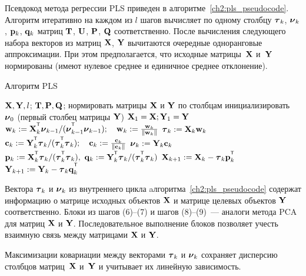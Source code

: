 \documentclass[11pt, a5paper]{dissert}
\begin{document}
Псевдокод метода регрессии PLS приведен в алгоритме~\ref{ch2:pls_pseudocode}.
Алгоритм итеративно на каждом из $l$ шагов вычисляет по одному столбцу $\boldsymbol{\tau}_k$, $\boldsymbol{\nu}_k$, $\mathbf{p}_k$, $\mathbf{q}_k$ матриц $\mathbf{T}$, $\mathbf{U}$, $\mathbf{P}$, $\mathbf{Q}$ соответственно. 
После вычисления следующего набора векторов из матриц $\mathbf{X}$, $\mathbf{Y}$ вычитаются очередные одноранговые аппроксимации. 
При этом предполагается, что исходные матрицы~$\mathbf{X}$ и~$\mathbf{Y}$ нормированы (имеют нулевое среднее и единичное среднее отклонение).

\begin{algorithm}[h]
	\caption{Алгоритм PLS}
	\label{ch2:pls_pseudocode}
	\begin{algorithmic}[1]
		\REQUIRE $\mathbf{X}, \mathbf{Y}, l$;
		\ENSURE $\mathbf{T}, \mathbf{P}, \mathbf{Q}$;
		\STATE нормировать матрицы $\mathbf{X}$ и $\mathbf{Y}$ по столбцам
		\STATE инициализировать $\boldsymbol{\nu}_0$ (первый столбец матрицы $\mathbf{Y}$)
		\STATE $\mathbf{X}_1 = \mathbf{X}; \mathbf{Y}_1 = \mathbf{Y}$
		\REPEAT
		\vspace{0.1cm}
		\STATE $\bw_k := \bX_k^{\T} \bnu_{k-1} / (\bnu_{k-1}^{\T} \bnu_{k-1}); \quad \bw_k: = \frac{\bw_k}{\| \bw_k \|}$
		\vspace{0.1cm}
		\STATE $\boldsymbol{\tau}_k := \mathbf{X}_k \mathbf{w}_k$
		\vspace{0.1cm}
		\STATE $\bc_k := \bY_k^{\T} \btau_k / (\btau_k^{\T} \btau_k); \quad \bc_k: = \frac{\bc_k}{\| \bc_k \|}$
		\vspace{0.1cm}
		\STATE $\boldsymbol{\nu}_k := \mathbf{Y}_k \mathbf{c}_k$
		\vspace{0.1cm}
		\STATE $\bp_k:= \bX_k^{\T}\btau_k/(\btau_k^{\T}\btau_k),\ 
		\bq_k := \bY_k^{\T}\btau_k/(\btau_k^{\T}\btau_k)$
		\vspace{0.2cm}
		\STATE $\bX_{k+1} :=  \bX_k - \btau_k \bp_k^{\T}$
		\vspace{0.2cm}
		\STATE $\bY_{k + 1} :=  \bY_k - \btau_k \bq_k^{\T}$ 
		\ENDFOR
	\end{algorithmic}
\end{algorithm}

Вектора $\boldsymbol{\tau}_k$ и $\boldsymbol{\nu}_k$ из внутреннего цикла aлгоритма~\ref{ch2:pls_pseudocode}
содержат информацию о матрице исходных объектов $\mathbf{X}$ и матрице целевых объектов $\mathbf{Y}$ соответственно. 
Блоки из шагов (6)--(7) и шагов (8)--(9)~--- аналоги метода PCA для матриц $\mathbf{X}$ и $\mathbf{Y}$. 
Последовательное выполнение блоков позволяет учесть взаимную связь между матрицами $\mathbf{X}$ и $\mathbf{Y}$.

\begin{statement}
	Максимизации ковариации между векторами $\boldsymbol{\tau}_k$ и $\boldsymbol{\nu}_k$ сохраняет дисперсию столбцов матриц~$\mathbf{X}$ и~$\mathbf{Y}$ и учитывает их линейную зависимость.
\end{statement}
\end{document}
